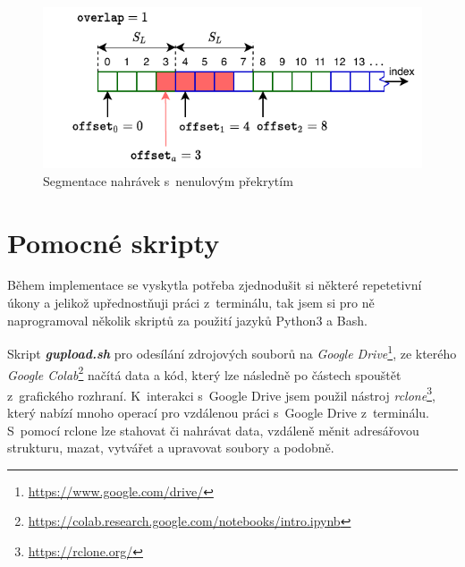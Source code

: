 \begin{figure}[H]
    \centering
    \includegraphics[scale=1.0]{obrazky-figures/segment_overlap.pdf}
    \caption{\label{fig:segment_overlap}Segmentace nahrávek s~nenulovým překrytím}
\end{figure}



%
%


\section{Pomocné skripty}
Během implementace se vyskytla potřeba zjednodušit si některé repetetivní úkony a jelikož upřednostňuji práci z~terminálu, tak jsem si pro ně naprogramoval několik skriptů za použití jazyků Python3 a Bash. 

Skript \textbf{\textit{gupload.sh}} pro odesílání zdrojových souborů na \textit{Google Drive}\footnote{\url{https://www.google.com/drive/}}, ze kterého \textit{Google Colab}\footnote{\url{https://colab.research.google.com/notebooks/intro.ipynb}} načítá data a kód, který lze následně po částech spouštět z~grafického rozhraní. K~interakci s~Google Drive jsem použil nástroj \textit{rclone}\footnote{\url{https://rclone.org/}}, který nabízí mnoho operací pro vzdálenou práci s~Google Drive z~terminálu. S~pomocí rclone lze stahovat či nahrávat data, vzdáleně měnit adresářovou strukturu, mazat, vytvářet a upravovat soubory a podobně. 

